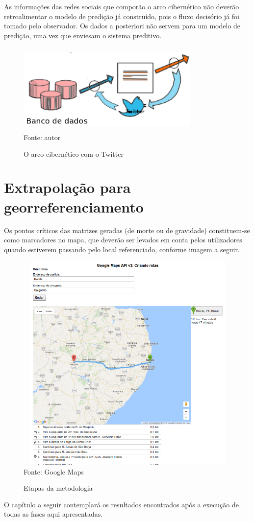 As informações das redes sociais que comporão o arco cibernético não deverão retroalimentar o modelo de predição já construído, pois o fluxo decisório já foi tomado pelo observador. Os dados a posteriori não servem para um modelo de predição, uma vez que enviesam o sistema preditivo.

\begin{figure}[ht]
	\centering
	\caption{O arco cibernético com o Twitter}
	\includegraphics[width=90mm, height=45mm]{Figuras/Metodologia/ArcoCibernetico.png}\\
	\tiny Fonte: autor
\end{figure}

\pagebreak

\section{Extrapolação para georreferenciamento}

Os pontos críticos das matrizes geradas (de morte ou de gravidade) constituem-se como marcadores no mapa, que deverão ser levados em conta pelos utilizadores quando estiverem passando pelo local referenciado, conforme imagem a seguir.


\begin{figure}[ht]
	\centering
	\caption{Etapas da metodologia}
	\includegraphics[width=150mm, height=110mm]{Figuras/Cronograma/GoogleMaps.png}\\
	\tiny Fonte: Google Maps
\end{figure}

O capítulo a seguir contemplará os resultados encontrados após a execução de todas as fases aqui apresentadas.


